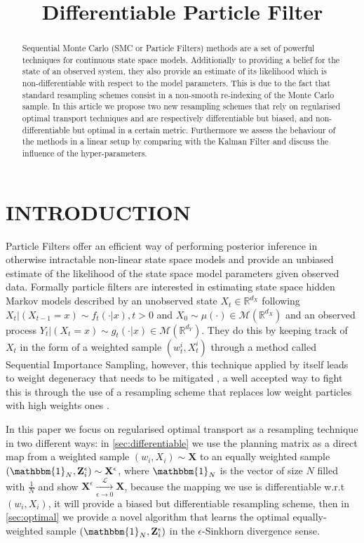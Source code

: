 \documentclass[]{article}
\title{Differentiable Particle Filter}
\author{} %
\begin{document}
\maketitle

\begin{abstract}
	Sequential Monte Carlo (SMC or Particle Filters) methods are a set of powerful techniques for continuous state space models. Additionally to providing a belief for the state of an observed system, they also provide an estimate of its likelihood which is non-differentiable with respect to the model parameters. This is due to the fact that standard resampling schemes consist in a non-smooth re-indexing of the Monte Carlo sample. In this article we propose two new resampling schemes that rely on regularised optimal transport techniques and are respectively differentiable but biased, and non-differentiable but optimal in a certain metric. Furthermore we assess the behaviour of the methods in a linear setup by comparing with the Kalman Filter and discuss the influence of the hyper-parameters.
\end{abstract}

\section{INTRODUCTION}
	Particle Filters \parencite[see][]{particlefilter} offer an efficient way of performing posterior inference in otherwise intractable non-linear state space models and provide an unbiased estimate of the likelihood of the state space model parameters given observed data. Formally particle filters are interested in estimating state space hidden Markov models described by an unobserved state $X_t \in \mathbb{R}^{d_X}$ following $X_t|(X_{t-1}=x) \sim f_t(\cdot|x), t > 0$ and $X_0 \sim \mu(\cdot) \in \mathcal{M}(\mathbb{R}^{d_X})$ and an observed process $Y_t|(X_t=x) \sim g_t(\cdot|x) \in \mathcal{M}(\mathbb{R}^{d_Y})$. They do this by keeping track of $X_t$ in the form of a weighted sample $(w^i_t, X_t^i)$ through a method called Sequential Importance Sampling, however, this technique applied by itself leads to weight degeneracy that needs to be mitigated \parencite[see][]{doucet2009tutorial}, a well accepted way to fight this is through the use of a resampling scheme that replaces low weight particles with high weights ones \parencite[see][]{hol2006resampling}. 
	
	In this paper we focus on regularised optimal transport as a resampling technique in two different ways: in \cref{sec:differentiable} we use the planning matrix as a direct map from a weighted sample $(w_i, X_i) \sim \mathbf{X}$ to an equally weighted sample $(\mathbbm{1}_N, \mathbf{Z}_i^{\epsilon}) \sim \mathbf{X}^{\epsilon}$, where $\mathbbm{1}_N$ is the vector of size $N$ filled with $\frac 1 N$ and show $\mathbf{X}^{\epsilon} \xrightarrow[\epsilon \to 0]{\mathcal{L}} \mathbf{X}$, because the mapping we use is differentiable w.r.t $(w_i, X_i)$, it will provide a biased but differentiable resampling scheme, then in \cref{sec:optimal} we provide a novel algorithm that learns the optimal equally-weighted sample $(\mathbbm{1}_N, \mathbf{Z}_i^{\epsilon})$ in the $\epsilon$-Sinkhorn divergence sense. 
	
\end{document}
